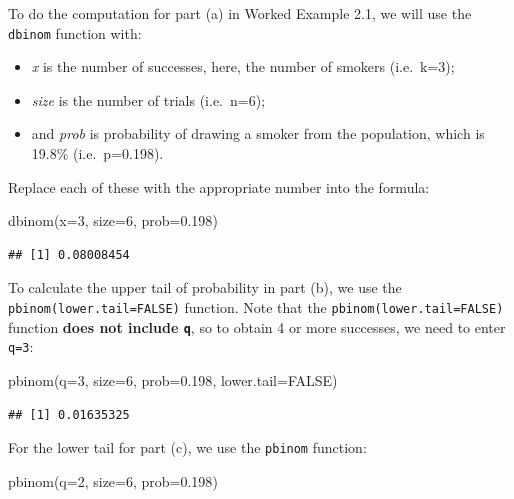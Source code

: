 \documentclass[
]{memoir}
\newenvironment{Shaded}{\begin{snugshade}}{\end{snugshade}}
\newcommand{\AttributeTok}[1]{\textcolor[rgb]{0.77,0.63,0.00}{#1}}
\newcommand{\ConstantTok}[1]{\textcolor[rgb]{0.00,0.00,0.00}{#1}}
\newcommand{\DecValTok}[1]{\textcolor[rgb]{0.00,0.00,0.81}{#1}}
\newcommand{\FloatTok}[1]{\textcolor[rgb]{0.00,0.00,0.81}{#1}}
\newcommand{\FunctionTok}[1]{\textcolor[rgb]{0.00,0.00,0.00}{#1}}
\newcommand{\NormalTok}[1]{#1}
\providecommand{\tightlist}{%
  \setlength{\itemsep}{0pt}\setlength{\parskip}{0pt}}
\begin{document}
To do the computation for part (a) in Worked Example 2.1, we will use the \texttt{dbinom} function with:

\begin{itemize}
\tightlist
\item
  \emph{x} is the number of successes, here, the number of smokers (i.e.~k=3);
\item
  \emph{size} is the number of trials (i.e.~n=6);
\item
  and \emph{prob} is probability of drawing a smoker from the population, which is 19.8\% (i.e.~p=0.198).
\end{itemize}

Replace each of these with the appropriate number into the formula:

\begin{Shaded}
\begin{Highlighting}[]
\FunctionTok{dbinom}\NormalTok{(}\AttributeTok{x=}\DecValTok{3}\NormalTok{, }\AttributeTok{size=}\DecValTok{6}\NormalTok{, }\AttributeTok{prob=}\FloatTok{0.198}\NormalTok{)}
\end{Highlighting}
\end{Shaded}

\begin{verbatim}
## [1] 0.08008454
\end{verbatim}

To calculate the upper tail of probability in part (b), we use the \texttt{pbinom(lower.tail=FALSE)} function. Note that the \texttt{pbinom(lower.tail=FALSE)} function \textbf{does not include \texttt{q}}, so to obtain 4 or more successes, we need to enter \texttt{q=3}:

\begin{Shaded}
\begin{Highlighting}[]
\FunctionTok{pbinom}\NormalTok{(}\AttributeTok{q=}\DecValTok{3}\NormalTok{, }\AttributeTok{size=}\DecValTok{6}\NormalTok{, }\AttributeTok{prob=}\FloatTok{0.198}\NormalTok{, }\AttributeTok{lower.tail=}\ConstantTok{FALSE}\NormalTok{)}
\end{Highlighting}
\end{Shaded}

\begin{verbatim}
## [1] 0.01635325
\end{verbatim}

For the lower tail for part (c), we use the \texttt{pbinom} function:

\begin{Shaded}
\begin{Highlighting}[]
\FunctionTok{pbinom}\NormalTok{(}\AttributeTok{q=}\DecValTok{2}\NormalTok{, }\AttributeTok{size=}\DecValTok{6}\NormalTok{, }\AttributeTok{prob=}\FloatTok{0.198}\NormalTok{)}
\end{Highlighting}
\end{Shaded}
\end{document}
